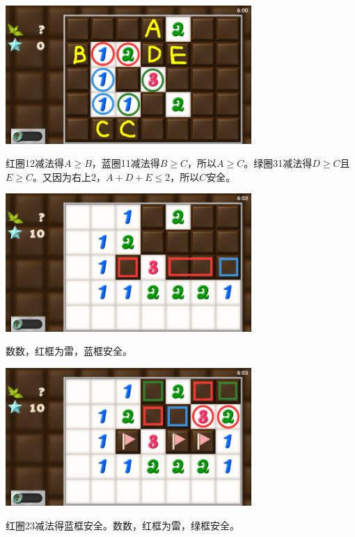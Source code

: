 \subsection{} %
\begin{center}
    \includegraphics[width=0.7\textwidth]{puzzle/101-1.png}
\end{center}
红圈12减法得$A\ge B$，蓝圈11减法得$B\ge C$，所以$A\ge C$。绿圈31减法得$D\ge C$且$E\ge C$。又因为右上2，$A+D+E\le 2$，所以$C$安全。
\begin{center}
    \includegraphics[width=0.7\textwidth]{puzzle/101-2.png}
\end{center}
数数，红框为雷，蓝框安全。
\begin{center}
    \includegraphics[width=0.7\textwidth]{puzzle/101-3.png}
\end{center}
红圈23减法得蓝框安全。数数，红框为雷，绿框安全。

